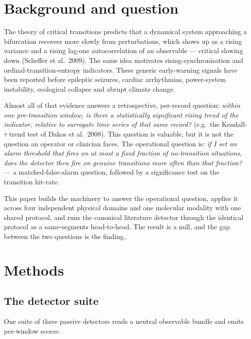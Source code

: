 \documentclass[11pt]{article}
\begin{document}
\section{Background and question}\label{sec:background}

The theory of critical transitions predicts that a dynamical system
approaching a bifurcation recovers more slowly from perturbations, which
shows up as a rising variance and a rising lag-one autocorrelation of an
observable --- critical slowing down (Scheffer et al.\ 2009). The same
idea motivates rising-synchronisation and ordinal-transition-entropy
indicators. These generic early-warning signals have been reported
before epileptic seizures, cardiac arrhythmias, power-system
instability, ecological collapse and abrupt climate change.

Almost all of that evidence answers a retrospective, per-record
question: \emph{within one pre-transition window, is there a
statistically significant rising trend of the indicator, relative to
surrogate time series of that same record?} (e.g.\ the Kendall-$\tau$
trend test of Dakos et al.\ 2008). This question is valuable, but it is
not the question an operator or clinician faces. The operational
question is: \emph{if I set an alarm threshold that fires on at most a
fixed fraction of no-transition situations, does the detector then fire
on genuine transitions more often than that fraction?} --- a
matched-false-alarm question, followed by a significance test on the
transition hit-rate.

This paper builds the machinery to answer the operational question,
applies it across four independent physical domains and one molecular
modality with one shared protocol, and runs the canonical literature
detector through the identical protocol as a same-segments
head-to-head. The result is a null, and the gap between the two
questions is the finding.

\section{Methods}\label{sec:methods}

\subsection{The detector suite}

One suite of three passive detectors reads a neutral observable bundle
and emits per-window scores:
\end{document}
